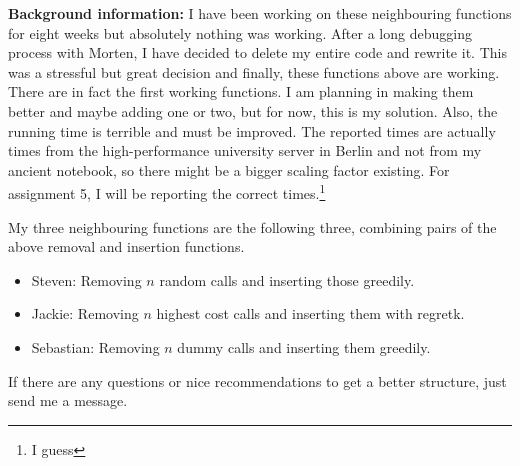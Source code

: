\documentclass[a4paper,11pt]{article}
\theoremstyle{mytheor}
\begin{document}
\textbf{Background information: }I have been working on these neighbouring functions for eight weeks but absolutely nothing was working. After a long debugging process with Morten, I have decided to delete my entire code and rewrite it. This was a stressful but great decision and finally, these functions above are working. There are in fact the first working functions. I am planning in making them better and maybe adding one or two, but for now, this is my solution. Also, the running time is terrible and must be improved. The reported times are actually times from the high-performance university server in Berlin and not from my ancient notebook, so there might be a bigger scaling factor existing. For assignment 5, I will be reporting the correct times.\footnote{I guess}\medskip

My three neighbouring functions are the following three, combining pairs of the above removal and insertion functions.
\begin{itemize}
\item Steven: Removing $n$ random calls and inserting those greedily.
\item Jackie: Removing $n$ highest cost calls and inserting them with regretk.
\item Sebastian: Removing $n$ dummy calls and inserting them greedily.
\end{itemize}

\medskip
If there are any questions or nice recommendations to get a better structure, just send me a message.
\end{document}
